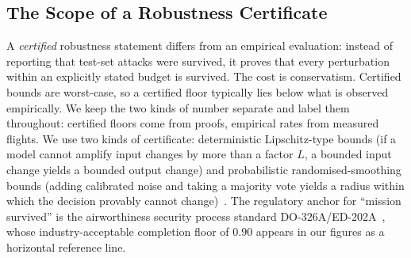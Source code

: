 \subsection{The Scope of a Robustness Certificate}
A \emph{certified} robustness statement differs from an empirical evaluation:
instead of reporting that test-set attacks were survived, it proves
that every perturbation within an explicitly stated budget is survived. The cost
is conservatism. Certified bounds are worst-case, so a certified floor typically
lies below what is observed empirically. We keep the two kinds of number
separate and label them throughout: certified floors come from proofs, empirical
rates from measured flights. We use two kinds of certificate: deterministic
Lipschitz-type bounds (if a model cannot amplify input changes by more than a
factor $L$, a bounded input change yields a bounded output change) and
probabilistic randomised-smoothing bounds (adding calibrated noise and taking a
majority vote yields a radius within which the decision provably cannot
change)~\cite{cohen2019smoothing}. The regulatory anchor for ``mission
survived'' is the airworthiness security process standard
DO-326A/ED-202A~\cite{do326a}, whose industry-acceptable completion floor of
$0.90$ appears in our figures as a horizontal reference line.


